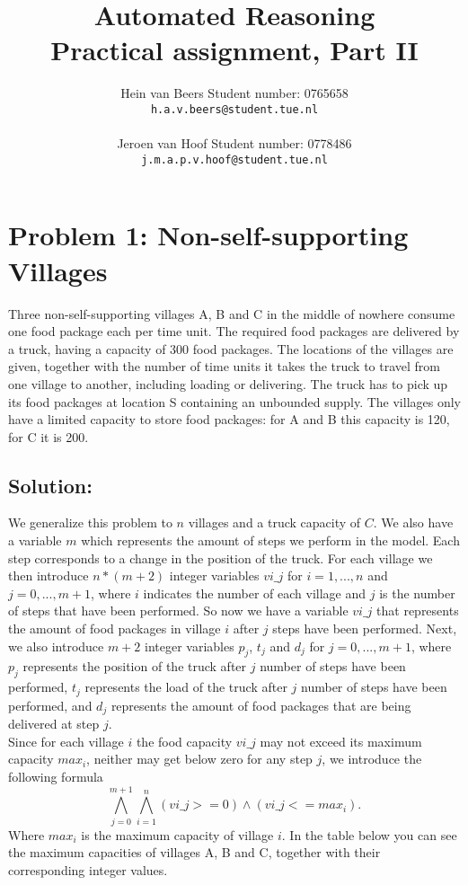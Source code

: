 \documentclass[a4paper]{article}
\author{Hein van Beers \qquad Student number: 0765658 \\{\tt h.a.v.beers@student.tue.nl}\\ \\ Jeroen van Hoof \qquad Student number: 0778486 \\{\tt j.m.a.p.v.hoof@student.tue.nl}}
\title{Automated Reasoning\\
	 \large Practical assignment, Part II}
\begin{document}
	\maketitle
	
	\section*{Problem 1: Non-self-supporting Villages}
	Three non-self-supporting villages A, B and C in the middle of nowhere consume one food package each per time unit. The required food packages are delivered by a truck, having a capacity of 300 food packages. The locations of the villages are given, together with the number of time units it takes the truck to travel from one village to another, including loading or delivering. The truck has to pick up its food packages at location S containing an unbounded supply. The villages only have a limited capacity to store food packages: for A and B this capacity is 120, for C it is 200.
	
	\subsection*{Solution:}
	We generalize this problem to $n$ villages and a truck capacity of $C$. We also have a variable $m$ which represents the amount of steps we perform in the model. Each step corresponds to a change in the position of the truck. For each village we then introduce $n * (m+2)$ integer variables $vi\_j$ for $i=1,...,n$ and $j=0,...,m+1$, where $i$ indicates the number of each village and $j$ is the number of steps that have been performed. So now we have a variable $vi\_j$ that represents the amount of food packages in village $i$ after $j$ steps have been performed. Next, we also introduce $m+2$ integer variables $p_j$, $t_j$ and $d_j$ for $j=0,...,m+1$, where $p_j$ represents the position of the truck after $j$ number of steps have been performed, $t_j$ represents the load of the truck after $j$ number of steps have been performed, and $d_j$ represents the amount of food packages that are being delivered at step $j$.\\
	
	Since for each village $i$ the food capacity $vi\_j$ may not exceed its maximum capacity $max_i$, neither may get below zero for any step $j$, we introduce the following formula
\[ \bigwedge_{j=0}^{m+1} \bigwedge_{i=1}^n (vi\_j >= 0) \wedge (vi\_j <= max_i).\]
Where $max_i$ is the maximum capacity of village $i$. In the table below you can see the maximum capacities of villages A, B and C, together with their corresponding integer values.
\end{document}
